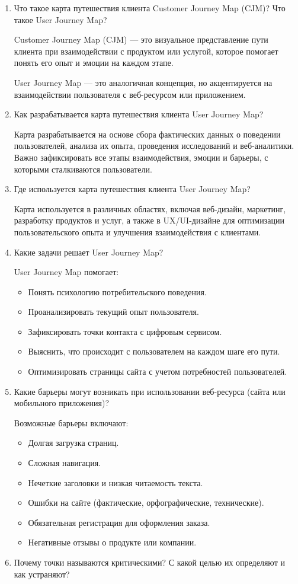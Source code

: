\begin{enumerate}
    \item Что такое карта путешествия клиента Customer Journey Map (CJM)? Что такое User Journey Map?

Customer Journey Map (CJM) — это визуальное представление пути клиента при взаимодействии с продуктом или услугой, которое помогает понять его опыт и эмоции на каждом этапе.

        User Journey Map — это аналогичная концепция, но акцентируется на взаимодействии пользователя с веб-ресурсом или приложением.
    \item Как разрабатывается карта путешествия клиента User Journey Map?

Карта разрабатывается на основе сбора фактических данных о поведении пользователей, анализа их опыта, проведения исследований и веб-аналитики. Важно зафиксировать все этапы взаимодействия, эмоции и барьеры, с которыми сталкиваются пользователи.
    \item Где используется карта путешествия клиента User Journey Map?

Карта используется в различных областях, включая веб-дизайн, маркетинг, разработку продуктов и услуг, а также в UX/UI-дизайне для оптимизации пользовательского опыта и улучшения взаимодействия с клиентами.
    \item Какие задачи решает User Journey Map?

User Journey Map помогает:
        \begin{itemize}
            \item Понять психологию потребительского поведения.
            \item Проанализировать текущий опыт пользователя.
            \item Зафиксировать точки контакта с цифровым сервисом.
            \item Выяснить, что происходит с пользователем на каждом шаге его пути.
            \item Оптимизировать страницы сайта с учетом потребностей пользователей.
        \end{itemize}
    \item Какие барьеры могут возникать при использовании веб-ресурса (сайта или мобильного приложения)?

Возможные барьеры включают:
        \begin{itemize}
            \item Долгая загрузка страниц.
            \item Сложная навигация.
            \item Нечеткие заголовки и низкая читаемость текста.
            \item Ошибки на сайте (фактические, орфографические, технические).
            \item Обязательная регистрация для оформления заказа.
            \item Негативные отзывы о продукте или компании.
        \end{itemize}
\item Почему точки называются критическими? С какой целью их определяют и как устраняют?


\end{enumerate}
